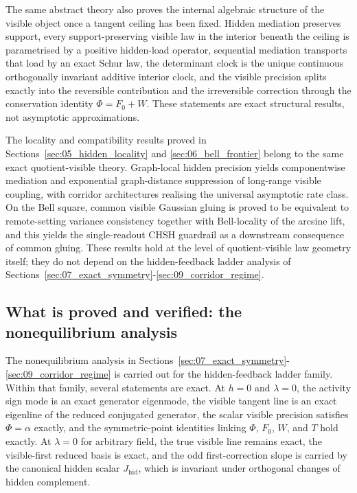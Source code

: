 \documentclass[11pt]{article}
\numberwithin{equation}{section}
\theoremstyle{thmcompact}
\theoremstyle{remark}
\begin{document}
The same abstract theory also proves the internal algebraic structure of the visible object once a tangent ceiling has been fixed. Hidden mediation preserves support, every support-preserving visible law in the interior beneath the ceiling is parametrised by a positive hidden-load operator, sequential mediation transports that load by an exact Schur law, the determinant clock is the unique continuous orthogonally invariant additive interior clock, and the visible precision splits exactly into the reversible contribution and the irreversible correction through the conservation identity $\Phi=F_0+W$. These statements are exact structural results, not asymptotic approximations.

The locality and compatibility results proved in Sections~\ref{sec:05_hidden_locality} and \ref{sec:06_bell_frontier} belong to the same exact quotient-visible theory. Graph-local hidden precision yields componentwise mediation and exponential graph-distance suppression of long-range visible coupling, with corridor architectures realising the universal asymptotic rate class. On the Bell square, common visible Gaussian gluing is proved to be equivalent to remote-setting variance consistency together with Bell-locality of the arcsine lift, and this yields the single-readout CHSH guardrail as a downstream consequence of common gluing. These results hold at the level of quotient-visible law geometry itself; they do not depend on the hidden-feedback ladder analysis of Sections~\ref{sec:07_exact_symmetry}-\ref{sec:09_corridor_regime}.

\subsection{What is proved and verified: the nonequilibrium analysis}

The nonequilibrium analysis in Sections~\ref{sec:07_exact_symmetry}-\ref{sec:09_corridor_regime} is carried out for the hidden-feedback ladder family. Within that family, several statements are exact. At $h=0$ and $\lambda=0$, the activity sign mode is an exact generator eigenmode, the visible tangent line is an exact eigenline of the reduced conjugated generator, the scalar visible precision satisfies $\Phi=\alpha$ exactly, and the symmetric-point identities linking $\Phi$, $F_0$, $W$, and $T$ hold exactly. At $\lambda=0$ for arbitrary field, the true visible line remains exact, the visible-first reduced basis is exact, and the odd first-correction slope is carried by the canonical hidden scalar $J_{\mathrm{hid}}$, which is invariant under orthogonal changes of hidden complement.
\end{document}
